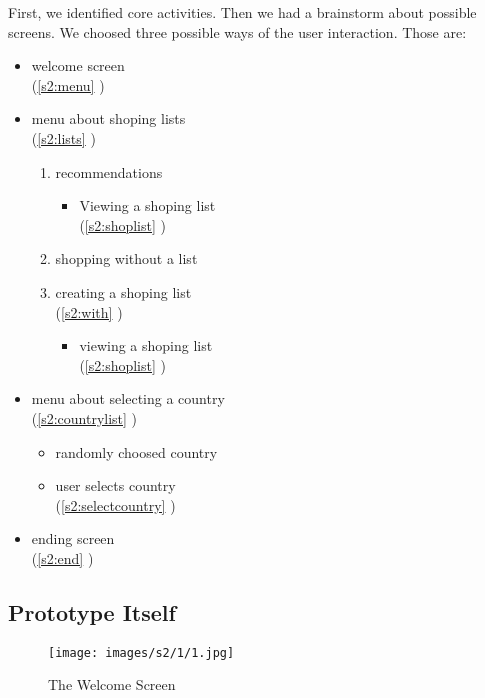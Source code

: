 First, we identified core activities. Then we had a brainstorm about possible screens. We choosed three possible ways of the user interaction. Those are:
\begin{itemize}
	\item welcome screen\\
	(\autoref{s2:menu} )
	
	\item menu about shoping lists\\
	(\autoref{s2:lists} )
	\begin{enumerate}
		\item recommendations
		\begin{itemize}
     		\item Viewing a shoping list\\
     		(\autoref{s2:shoplist} )
   		\end{itemize}
    	\item shopping without a list
    	\item creating a shoping list\\
    	(\autoref{s2:with} )
    	\begin{itemize}
     		\item viewing a shoping list\\
     		(\autoref{s2:shoplist} )
   		\end{itemize}
	\end{enumerate}
	
	\item menu about selecting a country\\
	(\autoref{s2:countrylist} )
	\begin{itemize}
     	\item randomly choosed country
     	\item user selects country\\
     	(\autoref{s2:selectcountry} )
   	\end{itemize}
   	
   	\item ending screen\\
   	(\autoref{s2:end} )
	
\end{itemize}

\clearpage
\subsection{Prototype Itself}

\begin{figure}[H]
	\centering
	\texttt{[image: images/s2/1/1.jpg]}
	\caption{ The Welcome Screen }
	\label{s2:menu}
\end{figure}

